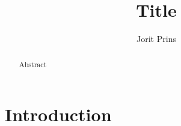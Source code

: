 \documentclass[twoside]{Style/uva-inf-bachelor-thesis}
\title{Title}
\author{Jorit Prins}
\begin{document}
\maketitle

\begin{abstract}
Abstract
\end{abstract}

\tableofcontents

\chapter{Introduction}



\printbibliography
\end{document}
